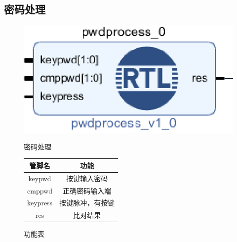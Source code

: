\documentclass[a4paper,11pt]{ctexart}
\begin{document}
\subsection{密码处理}
\begin{figure}[htb]
  \begin{minipage}[b]{0.5\textwidth}
    \centering
    \includegraphics[width = \textwidth]{./images/pwdprocess.eps}
    \caption{密码处理}
    \label{fig:by:table}
  \end{minipage}%
  \begin{minipage}[b]{0.5\textwidth}
    \centering
    \begin{tabular}{|c|c|} \hline
      管脚名 & 功能 \\ \hline\hline
      keypwd    &   按键输入密码 \\
      cmppwd    & 正确密码输入端 \\
      keypress  & 按键脉冲，有按键 \\
      res       &  比对结果 \\ \hline
    \end{tabular}
    \caption{功能表}
    \label{table:by:fig}
  \end{minipage}
\end{figure}
\end{document}
